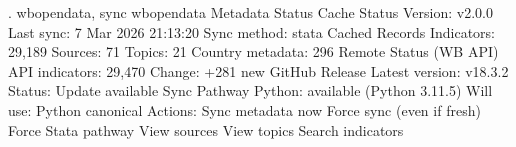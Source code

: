 . wbopendata, sync
{\smallskip}
wbopendata Metadata Status
{\smallskip}
  Cache Status
  Version:          v2.0.0
  Last sync:        7 Mar 2026 21:13:20
  Sync method:      stata
{\smallskip}
  Cached Records
  Indicators:          29,189
  Sources:                 71
  Topics:                  21
  Country metadata:       296
{\smallskip}
  Remote Status (WB API)
  API indicators:      29,470
  Change:           +281 new
{\smallskip}
  GitHub Release
  Latest version:   v18.3.2
  Status:           Update available
{\smallskip}
  Sync Pathway
  Python:           available (Python 3.11.5)
  Will use:         Python canonical
{\smallskip}
{\smallskip}
Actions:
{\smallskip}
    Sync metadata now
    Force sync (even if fresh)
    Force Stata pathway
{\smallskip}
    View sources
    View topics
    Search indicators
{\smallskip}
